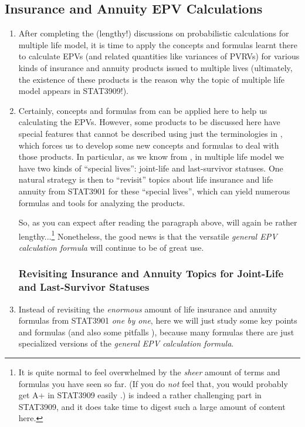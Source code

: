 \subsection{Insurance and Annuity EPV Calculations}
\label{subsect:mult-life-insur-annu-epv}
\begin{enumerate}
\item After completing the (lengthy!) discussions on probabilistic calculations
for multiple life model, it is time to apply the concepts and formulas learnt
there to calculate EPVs (and related quantities like variances of PVRVs) for
various kinds of insurance and annuity products issued to multiple lives
(ultimately, the existence of these products is the reason why the topic of
multiple life model appears in STAT3909!).

\item Certainly, concepts and formulas from  can
be applied here to help us calculating the EPVs. However, some products to be
discussed here have special features that cannot be described using just the
terminologies in , which forces us to
develop some new concepts and formulas to deal with those products. In
particular, as we know from , in multiple
life model we have two kinds of ``special lives'': joint-life and last-survivor
statuses. One natural strategy is then to ``revisit'' topics about life
insurance and life annuity from STAT3901 for these ``special lives'', which can
yield numerous formulas and tools for analyzing the products.

So, as you can expect after reading the paragraph above,
 will again be rather
lengthy...\footnote{It is quite normal to feel overwhelmed
 by the \emph{sheer} amount of terms and formulas you
have seen so far. (If you do \emph{not} feel that, you would probably get A+ in
STAT3909 easily .)  is
indeed a rather challenging part in STAT3909, and it does take time to digest
such a large amount of content here.} Nonetheless, the good
 news is that the versatile \emph{general EPV
calculation formula} will continue to be of great use.

\subsubsection*{Revisiting Insurance and Annuity Topics for Joint-Life and
Last-Survivor Statuses}
\item Instead of revisiting the \emph{enormous} amount of life insurance and
annuity formulas from STAT3901 \emph{one by one}, here we will just study some
key points and formulas (and also some pitfalls \warn{}), because many formulas
there are just specialized versions of the \emph{general EPV calculation
formula}.


\end{enumerate}
